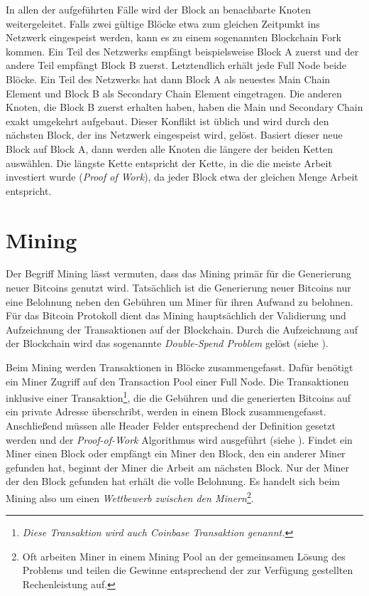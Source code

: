 \documentclass[ngerman,runningheads,a4paper]{llncs}[2018/03/10]
\begin{document}
In allen der aufgeführten Fälle wird der Block an benachbarte Knoten weitergeleitet. Falls zwei gültige Blöcke etwa zum gleichen Zeitpunkt ins Netzwerk eingespeist werden, kann es zu einem sogenannten Blockchain Fork kommen. Ein Teil des Netzwerks empfängt beispielsweise Block A zuerst und der andere Teil empfängt Block B zuerst. Letztendlich erhält jede Full Node beide Blöcke. Ein Teil des Netzwerks hat dann Block A als neuestes Main Chain Element und Block B als Secondary Chain Element eingetragen. Die anderen Knoten, die Block B zuerst erhalten haben, haben die Main und Secondary Chain exakt umgekehrt aufgebaut. Dieser Konflikt ist üblich und wird durch den nächsten Block, der ins Netzwerk eingespeist wird, gelöst. Basiert dieser neue Block auf Block A, dann werden alle Knoten die längere der beiden Ketten auswählen. Die längste Kette entspricht der Kette, in die die meiste Arbeit investiert wurde (\textit{Proof of Work}), da jeder Block etwa der gleichen Menge Arbeit entspricht.

\section{Mining}\label{sec:mining}

Der Begriff Mining lässt vermuten, dass das Mining primär für die Generierung neuer Bitcoins genutzt wird. Tatsächlich ist die Generierung neuer Bitcoins nur eine Belohnung neben den Gebühren um Miner für ihren Aufwand zu belohnen. Für das Bitcoin Protokoll dient das Mining hauptsächlich der Validierung und Aufzeichnung der Transaktionen auf der Blockchain. Durch die Aufzeichnung auf der Blockchain wird das sogenannte \textit{Double-Spend Problem} gelöst (siehe ).  

Beim Mining werden Transaktionen in Blöcke zusammengefasst. Dafür benötigt ein Miner Zugriff auf den Transaction Pool einer Full Node. Die Transaktionen inklusive einer Transaktion\footnote{\textit{Diese Transaktion wird auch \textit{Coinbase Transaktion} genannt.}}, die die Gebühren und die generierten Bitcoins auf ein private Adresse überschribt, werden in einem Block zusammengefasst. Anschließend müssen alle Header Felder entsprechend der Definition gesetzt werden und der \textit{Proof-of-Work} Algorithmus wird ausgeführt (siehe ). Findet ein Miner einen Block oder empfängt ein Miner den Block, den ein anderer Miner gefunden hat, beginnt der Miner die Arbeit am nächsten Block. Nur der Miner der den Block gefunden hat erhält die volle Belohnung. Es handelt sich beim Mining also um einen \textit{Wettbewerb zwischen den Minern}\footnote{Oft arbeiten Miner in einem Mining Pool an der gemeinsamen Lösung des Problems und teilen die Gewinne entsprechend der zur Verfügung gestellten Rechenleistung auf.}.
\end{document}
